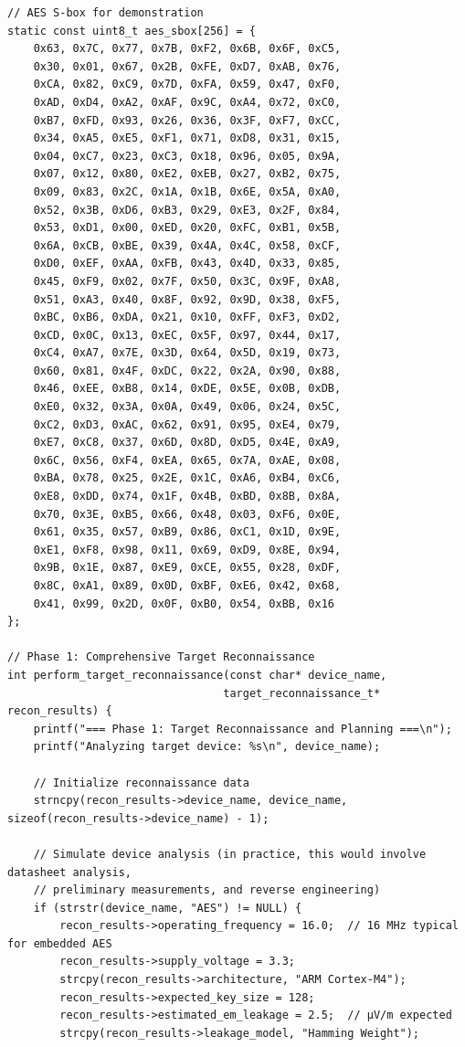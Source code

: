 \documentclass[11pt,a4paper]{article}
\theoremstyle{definition}
\begin{document}
\begin{lstlisting}[caption={Complete EM Attack Methodology Framework Implementation}]
// AES S-box for demonstration
static const uint8_t aes_sbox[256] = {
    0x63, 0x7C, 0x77, 0x7B, 0xF2, 0x6B, 0x6F, 0xC5,
    0x30, 0x01, 0x67, 0x2B, 0xFE, 0xD7, 0xAB, 0x76,
    0xCA, 0x82, 0xC9, 0x7D, 0xFA, 0x59, 0x47, 0xF0,
    0xAD, 0xD4, 0xA2, 0xAF, 0x9C, 0xA4, 0x72, 0xC0,
    0xB7, 0xFD, 0x93, 0x26, 0x36, 0x3F, 0xF7, 0xCC,
    0x34, 0xA5, 0xE5, 0xF1, 0x71, 0xD8, 0x31, 0x15,
    0x04, 0xC7, 0x23, 0xC3, 0x18, 0x96, 0x05, 0x9A,
    0x07, 0x12, 0x80, 0xE2, 0xEB, 0x27, 0xB2, 0x75,
    0x09, 0x83, 0x2C, 0x1A, 0x1B, 0x6E, 0x5A, 0xA0,
    0x52, 0x3B, 0xD6, 0xB3, 0x29, 0xE3, 0x2F, 0x84,
    0x53, 0xD1, 0x00, 0xED, 0x20, 0xFC, 0xB1, 0x5B,
    0x6A, 0xCB, 0xBE, 0x39, 0x4A, 0x4C, 0x58, 0xCF,
    0xD0, 0xEF, 0xAA, 0xFB, 0x43, 0x4D, 0x33, 0x85,
    0x45, 0xF9, 0x02, 0x7F, 0x50, 0x3C, 0x9F, 0xA8,
    0x51, 0xA3, 0x40, 0x8F, 0x92, 0x9D, 0x38, 0xF5,
    0xBC, 0xB6, 0xDA, 0x21, 0x10, 0xFF, 0xF3, 0xD2,
    0xCD, 0x0C, 0x13, 0xEC, 0x5F, 0x97, 0x44, 0x17,
    0xC4, 0xA7, 0x7E, 0x3D, 0x64, 0x5D, 0x19, 0x73,
    0x60, 0x81, 0x4F, 0xDC, 0x22, 0x2A, 0x90, 0x88,
    0x46, 0xEE, 0xB8, 0x14, 0xDE, 0x5E, 0x0B, 0xDB,
    0xE0, 0x32, 0x3A, 0x0A, 0x49, 0x06, 0x24, 0x5C,
    0xC2, 0xD3, 0xAC, 0x62, 0x91, 0x95, 0xE4, 0x79,
    0xE7, 0xC8, 0x37, 0x6D, 0x8D, 0xD5, 0x4E, 0xA9,
    0x6C, 0x56, 0xF4, 0xEA, 0x65, 0x7A, 0xAE, 0x08,
    0xBA, 0x78, 0x25, 0x2E, 0x1C, 0xA6, 0xB4, 0xC6,
    0xE8, 0xDD, 0x74, 0x1F, 0x4B, 0xBD, 0x8B, 0x8A,
    0x70, 0x3E, 0xB5, 0x66, 0x48, 0x03, 0xF6, 0x0E,
    0x61, 0x35, 0x57, 0xB9, 0x86, 0xC1, 0x1D, 0x9E,
    0xE1, 0xF8, 0x98, 0x11, 0x69, 0xD9, 0x8E, 0x94,
    0x9B, 0x1E, 0x87, 0xE9, 0xCE, 0x55, 0x28, 0xDF,
    0x8C, 0xA1, 0x89, 0x0D, 0xBF, 0xE6, 0x42, 0x68,
    0x41, 0x99, 0x2D, 0x0F, 0xB0, 0x54, 0xBB, 0x16
};

// Phase 1: Comprehensive Target Reconnaissance
int perform_target_reconnaissance(const char* device_name, 
                                 target_reconnaissance_t* recon_results) {
    printf("=== Phase 1: Target Reconnaissance and Planning ===\n");
    printf("Analyzing target device: %s\n", device_name);
    
    // Initialize reconnaissance data
    strncpy(recon_results->device_name, device_name, sizeof(recon_results->device_name) - 1);
    
    // Simulate device analysis (in practice, this would involve datasheet analysis,
    // preliminary measurements, and reverse engineering)
    if (strstr(device_name, "AES") != NULL) {
        recon_results->operating_frequency = 16.0;  // 16 MHz typical for embedded AES
        recon_results->supply_voltage = 3.3;
        strcpy(recon_results->architecture, "ARM Cortex-M4");
        recon_results->expected_key_size = 128;
        recon_results->estimated_em_leakage = 2.5;  // μV/m expected
        strcpy(recon_results->leakage_model, "Hamming Weight");
        

\end{lstlisting}
\end{document}
